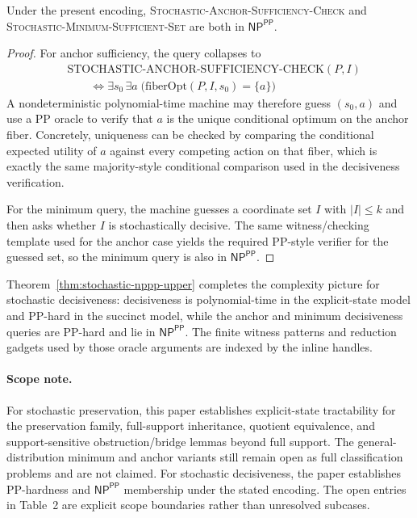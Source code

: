 \begin{theorem}\label{thm:stochastic-nppp-upper}
Under the present encoding, \textsc{Stochastic-Anchor-Sufficiency-Check} and \textsc{Stochastic-Minimum-Sufficient-Set} are both in $\textsf{NP}^{\textsf{PP}}$.
\end{theorem}


\begin{proof}
For anchor sufficiency, the query collapses to
\[
\begin{aligned}
&\mathrm{STOCHASTIC\mbox{-}ANCHOR\mbox{-}SUFFICIENCY\mbox{-}CHECK}(P,I) \\
&\qquad\iff \exists s_0\,\exists a\; \bigl(\mathrm{fiberOpt}(P,I,s_0)=\{a\}\bigr)
\end{aligned}
\]
 A nondeterministic polynomial-time machine may therefore guess $(s_0,a)$ and use a PP oracle to verify that $a$ is the unique conditional optimum on the anchor fiber. Concretely, uniqueness can be checked by comparing the conditional expected utility of $a$ against every competing action on that fiber, which is exactly the same majority-style conditional comparison used in the decisiveness verification.

For the minimum query, the machine guesses a coordinate set $I$ with $|I|\le k$ and then asks whether $I$ is stochastically decisive. The same witness/checking template used for the anchor case yields the required PP-style verifier for the guessed set, so the minimum query is also in $\textsf{NP}^{\textsf{PP}}$.
\end{proof}

Theorem~\ref{thm:stochastic-nppp-upper} completes the complexity picture for stochastic decisiveness: decisiveness is polynomial-time in the explicit-state model and PP-hard in the succinct model, while the anchor and minimum decisiveness queries are PP-hard and lie in $\textsf{NP}^{\textsf{PP}}$. The finite witness patterns and reduction gadgets used by those oracle arguments are indexed by the inline handles. 

\paragraph{Scope note.}
For stochastic preservation, this paper establishes explicit-state tractability for the preservation family, full-support inheritance, quotient equivalence, and support-sensitive obstruction/bridge lemmas beyond full support. The general-distribution minimum and anchor variants still remain open as full classification problems and are not claimed. For stochastic decisiveness, the paper establishes PP-hardness and $\textsf{NP}^{\textsf{PP}}$ membership under the stated encoding. The open entries in Table~2 are explicit scope boundaries rather than unresolved subcases.

